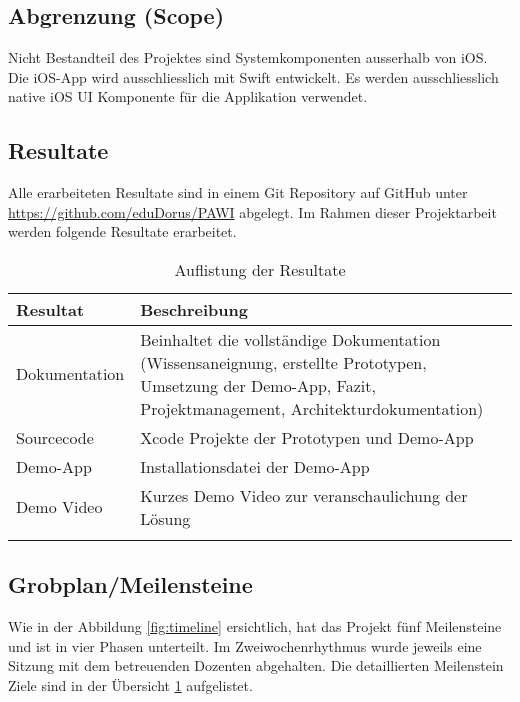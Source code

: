 \subsection{Abgrenzung (Scope)}
Nicht Bestandteil des Projektes sind Systemkomponenten ausserhalb von iOS. Die iOS-App wird ausschliesslich mit Swift entwickelt. Es werden ausschliesslich native iOS UI Komponente für die Applikation verwendet.

\subsection{Resultate}
Alle erarbeiteten Resultate sind in einem Git Repository auf GitHub unter \url{https://github.com/eduDorus/PAWI} abgelegt. Im Rahmen dieser Projektarbeit werden folgende Resultate erarbeitet. 
 
\begin{longtable}{l p{12.5cm}}
	\hline
	\textbf{Resultat} & \textbf{Beschreibung} \\
	\hline
	Dokumentation & Beinhaltet die vollständige Dokumentation (Wissensaneignung, erstellte Prototypen, Umsetzung der Demo-App, Fazit, Projektmanagement, Architekturdokumentation) \\
	Sourcecode & Xcode Projekte der Prototypen und Demo-App \\
	Demo-App & Installationsdatei der Demo-App \\
	Demo Video & Kurzes Demo Video zur veranschaulichung der Lösung \\
	\hline
	\caption{Auflistung der Resultate}
	\label{tab:meilensteine}
\end{longtable}

\subsection{Grobplan/Meilensteine}

Wie in der Abbildung \ref{fig:timeline} ersichtlich, hat das Projekt fünf Meilensteine und ist in vier Phasen unterteilt. Im Zweiwochenrhythmus wurde jeweils eine Sitzung mit dem betreuenden Dozenten abgehalten. Die detaillierten Meilenstein Ziele sind in der Übersicht \ref{tab:meilensteine} aufgelistet.

